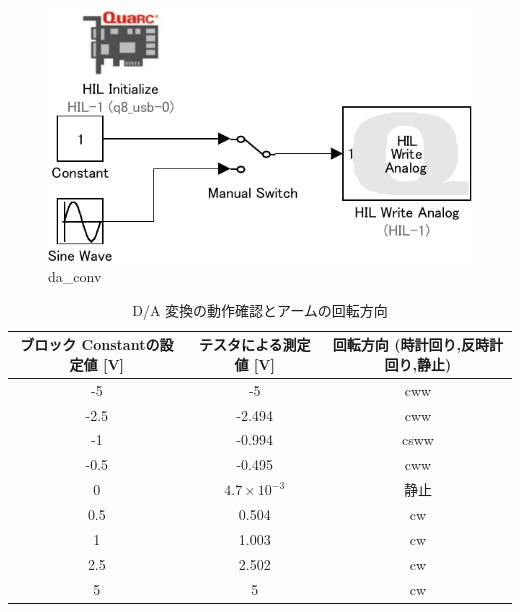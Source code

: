 \begin{figure}[h]
  \centering
  \includegraphics[scale=1]{sozai/da_conv-crop.pdf}
  \caption{da\_conv}
\end{figure}

\newpage

\begin{table}[h]
  \centering
  \caption{D/A 変換の動作確認とアームの回転方向}
  \begin{tabular}{|c|c|c|}
    \hline
    ブロック Constantの設定値 [V] & テスタによる測定値 [V] & 回転方向 (時計回り,反時計回り,静止) \\ \hline
    -5                            & -5                     & cww                                 \\ \hline
    -2.5                          & -2.494                 & cww                                 \\ \hline
    -1                            & -0.994                 & csww                                \\ \hline
    -0.5                          & -0.495                 & cww                                 \\ \hline
    0                             & \(4.7×10^{-3}\)        & 静止                                \\ \hline
    0.5                           & 0.504                  & cw                                  \\ \hline
    1                             & 1.003                  & cw                                  \\ \hline
    2.5                           & 2.502                  & cw                                  \\ \hline
    5                             & 5                      & cw                                  \\ \hline
  \end{tabular}
\end{table}

